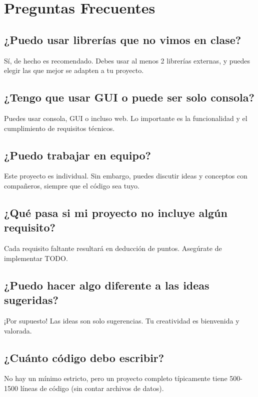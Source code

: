 \documentclass[12pt,a4paper]{article}
\begin{document}
\section{Preguntas Frecuentes}

\subsection{¿Puedo usar librerías que no vimos en clase?}

Sí, de hecho es recomendado. Debes usar al menos 2 librerías externas, y puedes elegir las que mejor se adapten a tu proyecto.

\subsection{¿Tengo que usar GUI o puede ser solo consola?}

Puedes usar consola, GUI o incluso web. Lo importante es la funcionalidad y el cumplimiento de requisitos técnicos.

\subsection{¿Puedo trabajar en equipo?}

Este proyecto es individual. Sin embargo, puedes discutir ideas y conceptos con compañeros, siempre que el código sea tuyo.

\subsection{¿Qué pasa si mi proyecto no incluye algún requisito?}

Cada requisito faltante resultará en deducción de puntos. Asegúrate de implementar TODO.

\subsection{¿Puedo hacer algo diferente a las ideas sugeridas?}

¡Por supuesto! Las ideas son solo sugerencias. Tu creatividad es bienvenida y valorada.

\subsection{¿Cuánto código debo escribir?}

No hay un mínimo estricto, pero un proyecto completo típicamente tiene 500-1500 líneas de código (sin contar archivos de datos).
\end{document}

